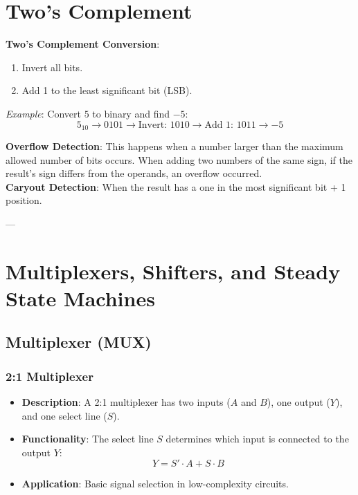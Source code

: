 \documentclass[10pt]{article}
\begin{document}
\begin{multicols}{2}
\section{Two's Complement}
\textbf{Two's Complement Conversion}:
\begin{enumerate}\itemsep0pt
    \item Invert all bits.
    \item Add 1 to the least significant bit (LSB).
\end{enumerate}
\textit{Example}: Convert \(5\) to binary and find \(-5\):
\[
5_{10} \rightarrow 0101 \rightarrow \text{Invert: } 1010 \rightarrow \text{Add 1: } 1011 \rightarrow -5
\]

\textbf{Overflow Detection}: This happens when a number larger than the maximum 
allowed number of bits occurs. When adding two numbers of the same sign, if the result’s sign differs from the operands, an overflow occurred.
\\
\textbf{Caryout Detection}: When the result has a one in the most significant bit + 1 position.

--- %

\section{Multiplexers, Shifters, and Steady State Machines}

\subsection{Multiplexer (MUX)}
\subsubsection{2:1 Multiplexer}
\begin{itemize}
    \item \textbf{Description}: A 2:1 multiplexer has two inputs (\( A \) and \( B \)), one output (\( Y \)), and one select line (\( S \)).
    \item \textbf{Functionality}: The select line \( S \) determines which input is connected to the output \( Y \):
    \[
    Y = S' \cdot A + S \cdot B
    \]
    
    \item \textbf{Application}: Basic signal selection in low-complexity circuits.
\end{itemize}


\end{multicols}
\end{document}
